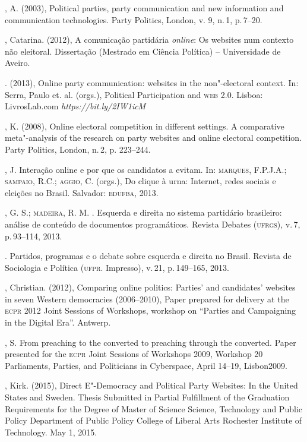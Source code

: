 \begin{bibliohedra}
, A. (2003), Political parties, party communication and new
information and communication technologies. Party Politics, London, v.
9, n.\,1, p.\,7--20.

, Catarina. (2012), A comunicação partidária \emph{\emph{online}}: Os websites
num contexto não eleitoral. Dissertação (Mestrado em Ciência Política)
-- Universidade de Aveiro.

\titidem. (2013), Online party communication: websites in the
non"-electoral context. In: Serra, Paulo et. al. (orgs.), Political
Participation and \textsc{web 2.0}. Lisboa: LivrosLab.com
\emph{https://bit.ly/2IW1icM}

, K. (2008), Online electoral competition in different
settings. A comparative meta"-analysis of the research on party websites
and online electoral competition. Party Politics, London, n.\,2, p.
223--244.

, J. Interação online e por que os candidatos a evitam.
In: \textsc{marques}, F.P.J.A.; \textsc{sampaio}, R.C.; \textsc{aggio}, C. (orgs.), Do clique à
urna: Internet, redes sociais e eleições no Brasil. Salvador: \textsc{edufba},
2013.

, G. S.; \textsc{madeira}, R. M. . Esquerda e direita no sistema
partidário brasileiro: análise de conteúdo de documentos programáticos.
Revista Debates (\textsc{ufrgs}), v.\,7, p.\,93--114, 2013.

\titidem. Partidos, programas e o debate sobre
esquerda e direita no Brasil. Revista de Sociologia e Política (\textsc{ufpr}.
Impresso), v.\,21, p.\,149--165, 2013.

, Christian. (2012), Comparing online politics: Parties' and
candidates' websites in seven Western democracies (2006--2010), Paper
prepared for delivery at the \textsc{ecpr} 2012 Joint Sessions of Workshops,
workshop on ``Parties and Campaigning in the Digital Era''. Antwerp.

, S. From preaching to the converted to preaching through the
converted. Paper presented for the \textsc{ecpr} Joint Sessions of Workshops
2009, Workshop 20 Parliaments, Parties, and Politicians in Cyberspace,
April 14--19, Lisbon2009.

, Kirk. (2015), Direct E"-Democracy and Political Party Websites:
In the United States and Sweden. Thesis Submitted in Partial Fulfillment
of the Graduation Requirements for the Degree of Master of Science
Science, Technology and Public Policy Department of Public Policy
College of Liberal Arts Rochester Institute of Technology. May 1, 2015.


\end{bibliohedra}
